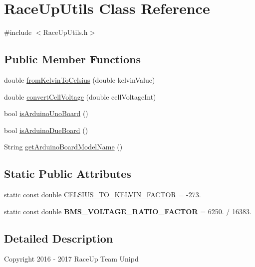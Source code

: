 \hypertarget{class_race_up_utils}{}\section{Race\+Up\+Utils Class Reference}
\label{class_race_up_utils}


{\ttfamily \#include $<$Race\+Up\+Utils.\+h$>$}

\subsection*{Public Member Functions}
\begin{DoxyCompactItemize}
\item 
double \hyperlink{class_race_up_utils_ac40afe767e8d781d06effb03e9de8971}{from\+Kelvin\+To\+Celsius} (double kelvin\+Value)
\item 
double \hyperlink{class_race_up_utils_ad57a448fb6131a2a38b0c3a8c967ee58}{convert\+Cell\+Voltage} (double cell\+Voltage\+Int)
\item 
bool \hyperlink{class_race_up_utils_a0cc09fd89b708aed73b075b34b646e9a}{is\+Arduino\+Uno\+Board} ()
\item 
bool \hyperlink{class_race_up_utils_a2625dadfdc9f45584c71a8872a7058d7}{is\+Arduino\+Due\+Board} ()
\item 
String \hyperlink{class_race_up_utils_a331fe79dbe61bd7cd84a61b9a05c72e4}{get\+Arduino\+Board\+Model\+Name} ()
\end{DoxyCompactItemize}
\subsection*{Static Public Attributes}
\begin{DoxyCompactItemize}
\item 
static const double \hyperlink{class_race_up_utils_aa0db44e06e075ffd8693cc222f3becfb}{C\+E\+L\+S\+I\+U\+S\+\_\+\+T\+O\+\_\+\+K\+E\+L\+V\+I\+N\+\_\+\+F\+A\+C\+T\+OR} = -\/273.
\item 
static const double {\bfseries B\+M\+S\+\_\+\+V\+O\+L\+T\+A\+G\+E\+\_\+\+R\+A\+T\+I\+O\+\_\+\+F\+A\+C\+T\+OR} = 6250. / 16383.\hypertarget{class_race_up_utils_a0575a05c5b9f884dbaa445fad65a9ccd}{}\label{class_race_up_utils_a0575a05c5b9f884dbaa445fad65a9ccd}

\end{DoxyCompactItemize}


\subsection{Detailed Description}
Copyright 2016 -\/ 2017 Race\+Up Team Unipd

